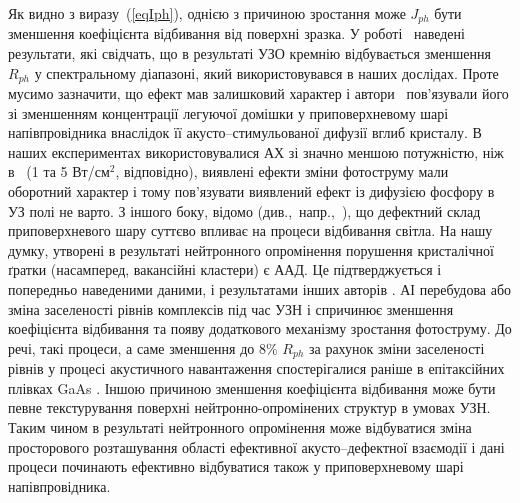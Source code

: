 Як видно з виразу~(\ref{eqIph}), однією з причиною зростання може $J_{ph}$ бути зменшення коефіцієнта відбивання від поверхні зразка.
У роботі~\cite{Zaver} наведені результати, які свідчать, що в результаті УЗО кремнію відбувається
зменшення $R_{ph}$ у спектральному
діапазоні, який використовувався в наших дослідах.
Проте мусимо зазначити, що ефект мав залишковий характер і
автори~\cite{Zaver} пов’язували його зі зменшенням концентрації
легуючої домішки у приповерхневому шарі напівпровідника внаслідок
її акусто--стимульованої дифузії вглиб кристалу.
В наших експериментах використовувалися АХ зі значно меншою потужністю, ніж
в~\cite{Zaver} (1 та 5 Вт/см$^2$, відповідно),  виявлені ефекти зміни фотоструму мали оборотний характер
і тому пов'язувати виявлений ефект із дифузією фосфору в УЗ полі не варто.
З іншого боку, відомо (див.,~напр.,~\cite{Kizel}), що дефектний склад
приповерхневого шару суттєво впливає на процеси відбивання світла.
На нашу думку, утворені в результаті нейтронного опромінення порушення кристалічної ґратки
(насамперед, вакансійні кластери) є ААД.
Це підтверджується і попередньо наведеними даними, і результатами інших авторів \cite{YOlikh2006TPLr}.
АІ перебудова або зміна заселеності рівнів комплексів під час УЗН і спричинює зменшення коефіцієнта відбивання
та появу додаткового механізму зростання фотоструму.
До речі, такі процеси, а саме зменшення до 8\% $R_{ph}$ за рахунок зміни заселеності рівнів у
процесі акустичного навантаження спостерігалися раніше в
епітаксійних плівках GaAs \cite{Korotch}.
Іншою причиною зменшення
коефіцієнта відбивання може бути певне текстурування поверхні нейтронно-опромінених
структур в умовах УЗН.
Таким чином в результаті нейтронного опромінення може відбуватися
зміна просторового розташування області ефективної акусто--дефектної
взаємодії і дані процеси починають ефективно відбуватися також у
приповерхневому шарі напівпровідника.



